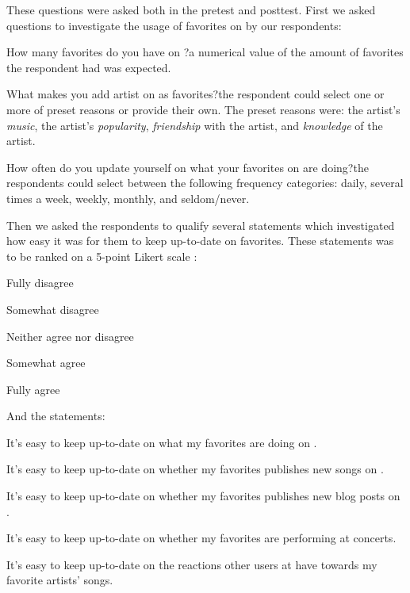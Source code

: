 These questions were asked both in the pretest and posttest. First we asked
questions to investigate the usage of favorites on \urort{} by our
respondents:

\begin{items}
  \item How many favorites do you have on \urort{}?\dash{}a numerical value
    of the amount of favorites the respondent had was expected.
  \item What makes you add artist on \urort{} as favorites?\dash{}the
    respondent could select one or more of preset reasons or provide their
    own. The preset reasons were: the artist's \emph{music},
    the artist's \emph{popularity}, \emph{friendship} with the artist,
    and \emph{knowledge} of the artist.
  \item How often do you update yourself on what your favorites on \urort{}
    are doing?\dash{}the respondents could select between the following
    frequency categories: daily, several times a week, weekly, monthly,
    and seldom/never.
\end{items}

Then we asked the respondents to qualify several statements which investigated
how easy it was for them to keep up-to-date on favorites.
These statements
was to be ranked on a 5-point Likert scale \citep{likert32}:

\begin{items}
  \item Fully disagree
  \item Somewhat disagree
  \item Neither agree nor disagree
  \item Somewhat agree
  \item Fully agree
\end{items}

And the statements:

\begin{items}
  \item It's easy to keep up-to-date on what my favorites are doing
    on \urort{}.
  \item It's easy to keep up-to-date on whether my favorites publishes
    new songs on \urort{}.
  \item It's easy to keep up-to-date on whether my favorites publishes
    new blog posts on \urort{}.
  \item It's easy to keep up-to-date on whether my favorites are
    performing at concerts.
  \item It's easy to keep up-to-date on the reactions other users at
    \urort{} have towards my favorite artists' songs.
\end{items}

